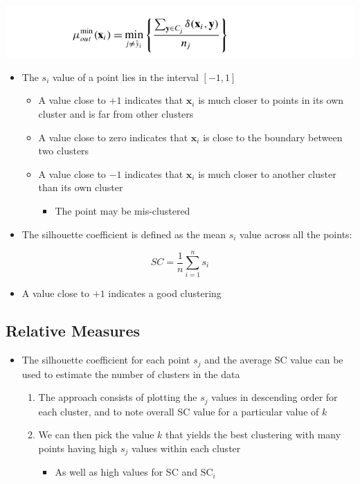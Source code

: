 \documentclass[11pt]{article}
\begin{document}
\begin{center}
\includegraphics[width=.9\linewidth]{Clustering Validation/screenshot_2018-11-25_09-55-59.png}
\end{center}
\begin{itemize}
\item The \(s_i\) value of a point lies in the interval \([-1, 1]\)
\begin{itemize}
\item A value close to \(+1\) indicates that \(\pmb x_i\) is much closer to points in its own cluster and is far from other clusters
\item A value close to zero indicates that \(\pmb x_i\) is close to the boundary between two clusters
\item A value close to \(-1\) indicates that \(\pmb x_i\) is much closer to another cluster than its own cluster
\begin{itemize}
\item The point may be mis-clustered
\end{itemize}
\end{itemize}

\item The silhouette coefficient is defined as the mean \(s_i\) value across all the points:
\end{itemize}
\begin{equation}
	SC = \frac1n \sum_{i=1}^n s_i
\end{equation}
\begin{itemize}
\item A value close to \(+1\) indicates a good clustering
\end{itemize}

\subsection{Relative Measures}
\label{sec:org043ca2a}
\begin{itemize}
\item The silhouette coefficient for each point \(s_j\) and the average SC value can be used to estimate the number of clusters in the data
\begin{enumerate}
\item The approach consists of plotting the \(s_j\) values in descending order for each cluster, and to note overall SC value for a particular value of \(k\)
\item We can then pick the value \(k\) that yields the best clustering with many points having high \(s_j\) values within each cluster
\begin{itemize}
\item As well as high values for SC and \(\text{SC}_i\)
\end{itemize}
\end{enumerate}
\end{itemize}
\end{document}
